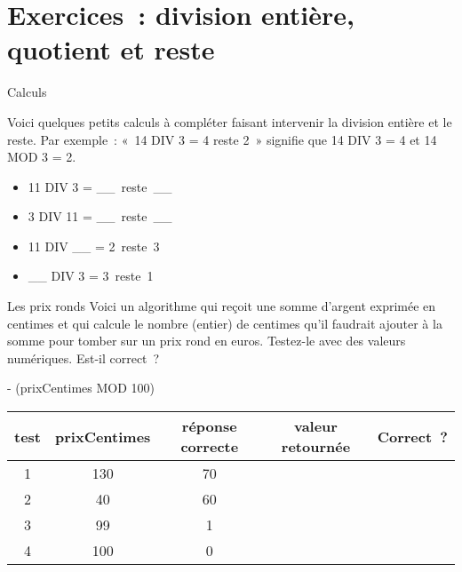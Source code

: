 \section{Exercices~: division entière, quotient et reste}

\begin{Exercice}{Calculs}

	Voici quelques petits calculs à compléter faisant intervenir la division entière
	et le reste.  Par exemple~: «~14 DIV 3 = 4 reste 2~» signifie que 14 DIV 3 = 4 et
	14 MOD 3 = 2.

	\begin{multicols}{2}
		\begin{itemize}
			\item 11 DIV 3 = \_\_\ reste\ \_\_
			\item 3 DIV 11 = \_\_\ reste\ \_\_
			\item 11 DIV \_\_ = 2\ reste\ 3
			\item \_\_ DIV 3 = 3\ reste\ 1
		\end{itemize}
	\end{multicols}
\end{Exercice}

\begin{Exercice}{Les prix ronds}
	Voici un algorithme qui reçoit une somme d’argent exprimée en centimes
	et qui calcule le nombre (entier) de centimes qu’il
	faudrait ajouter à la somme pour tomber sur un prix rond en euros.
	Testez-le avec des valeurs numériques. Est-il correct~?

	\begin{pseudocode}
		 - (prixCentimes MOD 100)
	\EndAlgo
\end{pseudocode}

\begin{center}
	\begin{tabular}{|c|c|c|c|c|}
		\hline
		test \no & prixCentimes & réponse correcte & valeur retournée & Correct~? \\\hline
		\hline 
		1 & 130 & 70 &  & \\\hline
		2 & 40  & 60 &  & \\\hline
		3 & 99  & 1  &  & \\\hline
		4 & 100 & 0  &  & \\\hline
	\end{tabular}
\end{center}

\end{Exercice}

